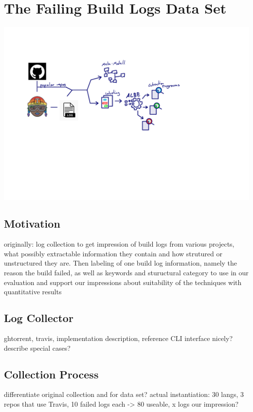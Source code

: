 \documentclass[\myrootdir/main.tex]{subfiles}
\begin{document}
\chapter{The Failing Build Logs Data Set}
\includegraphics[page=5, width=\textwidth, trim={0.5cm 0.5cm 0.5cm 0.5cm}, clip]{img/flow-of-research.pdf}

\label{data-set}
\section{Motivation}
originally: log collection to get impression of build logs from various projects, what possibly extractable information they contain and how strutured or unstructured they are.
Then labeling of one build log information, namely the reason the build failed, as well as keywords and stuructural category to use in our evaluation and support our impressions about suitability of the techniques with quantitative results

\section{Log Collector}
ghtorrent, travis, implementation description, reference CLI interface nicely?
describe special cases?

\section{Collection Process}
differentiate original collection and for data set?
actual instantiation: 30 langs, 3 repos that use Travis, 10 failed logs each -> 80 useable, x logs
our impression?
\end{document}
